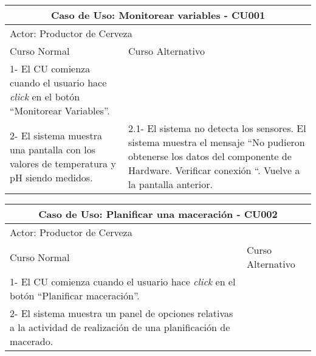    \begin{minipage}{0.95\textwidth}
    \begin{center}
    \begin{tabularx}{\textwidth}{ | X | X |}
        \hline
        \multicolumn{2}{|c|}{\textbf{Caso de Uso: Monitorear variables - CU001}} \\
        \hline
        \multicolumn{2}{|l|}{Actor: Productor de Cerveza} \\
        \hline
        Curso Normal & Curso Alternativo \\
        \hline
        1- El CU comienza cuando el usuario hace \textit{click} en el botón “Monitorear Variables”. & \\
        \hline
        2- El sistema muestra una pantalla con los valores de temperatura y pH siendo medidos. & 2.1- El sistema no detecta los sensores. 
        El sistema muestra el mensaje “No pudieron obtenerse los datos del componente de Hardware. Verificar conexión “. Vuelve a la pantalla anterior.
        \\
        \hline
    \end{tabularx}
    \label{CU001}
    \end{center}
    \end{minipage}
    
    
    \begin{minipage}{0.95\textwidth}
    \begin{center}
    \begin{tabularx}{\textwidth}{ | X | X |}
        \hline
        \multicolumn{2}{|c|}{\textbf{Caso de Uso: Planificar una maceración - CU002}} \\
        \hline
        \multicolumn{2}{|l|}{Actor: Productor de Cerveza} \\
        \hline
        Curso Normal & Curso Alternativo \\
        \hline
        1- El CU comienza cuando el usuario hace \textit{click} en el botón “Planificar maceración”. & \\
        \hline
        2- El sistema muestra un panel de opciones relativas a la actividad de realización de una planificación de macerado. & 
        \\
        \hline
    \end{tabularx}
    \label{CU002}
    \end{center}
    \end{minipage}
    
